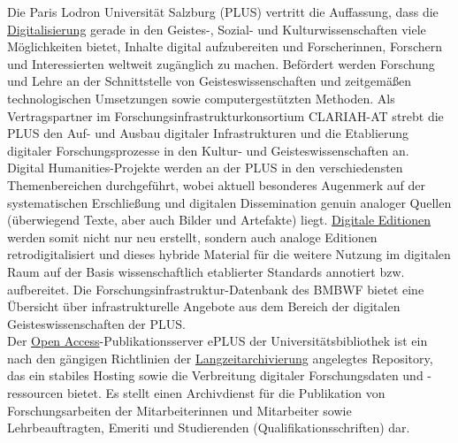 \documentclass{article}
\begin{document}
    Die Paris Lodron Universität Salzburg (PLUS) vertritt die Auffassung, dass die \href{http://gams.uni-graz.at/o:konde.60}{Digitalisierung} gerade in den Geistes-, Sozial- und Kulturwissenschaften viele Möglichkeiten bietet, Inhalte digital aufzubereiten und Forscherinnen, Forschern und Interessierten weltweit zugänglich zu machen. Befördert werden Forschung und Lehre an der Schnittstelle von Geisteswissenschaften und zeitgemäßen technologischen Umsetzungen sowie computergestützten Methoden. Als Vertragspartner im Forschungsinfrastrukturkonsortium CLARIAH-AT strebt die PLUS den Auf- und Ausbau digitaler Infrastrukturen und die Etablierung digitaler Forschungsprozesse in den Kultur- und Geisteswissenschaften an.\\
            
        Digital Humanities-Projekte werden an der PLUS in den verschiedensten Themenbereichen durchgeführt, wobei aktuell besonderes Augenmerk auf der systematischen Erschließung und digitalen Dissemination genuin analoger Quellen (überwiegend Texte, aber auch Bilder und Artefakte) liegt. \href{http://gams.uni-graz.at/o:konde.59}{Digitale Editionen} werden somit nicht nur neu erstellt, sondern auch analoge Editionen retrodigitalisiert und dieses hybride Material für die weitere Nutzung im digitalen Raum auf der Basis wissenschaftlich etablierter Standards annotiert bzw. aufbereitet. Die Forschungsinfrastruktur-Datenbank des BMBWF bietet eine Übersicht über infrastrukturelle Angebote aus dem Bereich der digitalen Geisteswissenschaften der PLUS. \\
            
        Der \href{http://gams.uni-graz.at/o:konde.152}{Open Access}-Publikationsserver ePLUS der Universitätsbibliothek ist ein nach den gängigen Richtlinien der \href{http://gams.uni-graz.at/o:konde.6}{Langzeitarchivierung} angelegtes Repository, das ein stabiles Hosting sowie die Verbreitung digitaler Forschungsdaten und -ressourcen bietet. Es stellt einen Archivdienst für die Publikation von Forschungsarbeiten der Mitarbeiterinnen und Mitarbeiter sowie Lehrbeauftragten, Emeriti und Studierenden (Qualifikationsschriften) dar.\\
            
\end{document}
